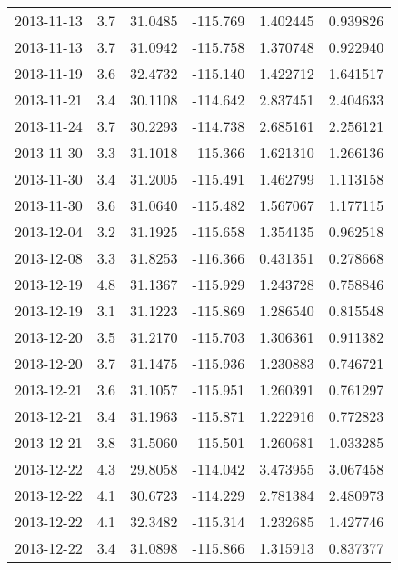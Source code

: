 \begin{tabular}{lrrrrr}
2013-11-13 &       3.7 &  31.0485 &  -115.769 &         1.402445 &         0.939826 \\
2013-11-13 &       3.7 &  31.0942 &  -115.758 &         1.370748 &         0.922940 \\
2013-11-19 &       3.6 &  32.4732 &  -115.140 &         1.422712 &         1.641517 \\
2013-11-21 &       3.4 &  30.1108 &  -114.642 &         2.837451 &         2.404633 \\
2013-11-24 &       3.7 &  30.2293 &  -114.738 &         2.685161 &         2.256121 \\
2013-11-30 &       3.3 &  31.1018 &  -115.366 &         1.621310 &         1.266136 \\
2013-11-30 &       3.4 &  31.2005 &  -115.491 &         1.462799 &         1.113158 \\
2013-11-30 &       3.6 &  31.0640 &  -115.482 &         1.567067 &         1.177115 \\
2013-12-04 &       3.2 &  31.1925 &  -115.658 &         1.354135 &         0.962518 \\
2013-12-08 &       3.3 &  31.8253 &  -116.366 &         0.431351 &         0.278668 \\
2013-12-19 &       4.8 &  31.1367 &  -115.929 &         1.243728 &         0.758846 \\
2013-12-19 &       3.1 &  31.1223 &  -115.869 &         1.286540 &         0.815548 \\
2013-12-20 &       3.5 &  31.2170 &  -115.703 &         1.306361 &         0.911382 \\
2013-12-20 &       3.7 &  31.1475 &  -115.936 &         1.230883 &         0.746721 \\
2013-12-21 &       3.6 &  31.1057 &  -115.951 &         1.260391 &         0.761297 \\
2013-12-21 &       3.4 &  31.1963 &  -115.871 &         1.222916 &         0.772823 \\
2013-12-21 &       3.8 &  31.5060 &  -115.501 &         1.260681 &         1.033285 \\
2013-12-22 &       4.3 &  29.8058 &  -114.042 &         3.473955 &         3.067458 \\
2013-12-22 &       4.1 &  30.6723 &  -114.229 &         2.781384 &         2.480973 \\
2013-12-22 &       4.1 &  32.3482 &  -115.314 &         1.232685 &         1.427746 \\
2013-12-22 &       3.4 &  31.0898 &  -115.866 &         1.315913 &         0.837377 \\

\end{tabular}
